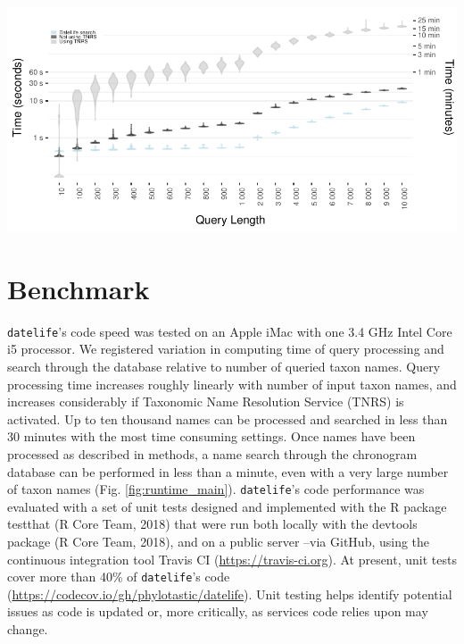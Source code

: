 \documentclass[
  man]{apa6}
\begin{document}
\begin{center}
\includegraphics[width= 6.5in]{../figures/fig_runtime_main.pdf}
\end{center}

\label{fig:runtime_main}

\hypertarget{benchmark}{%
\section{Benchmark}\label{benchmark}}

\texttt{datelife}'s code speed was tested on an Apple iMac
with one 3.4 GHz Intel Core i5 processor.
We registered variation in computing time of query processing and search through the database relative to number of queried taxon names.
Query processing time increases roughly linearly with number of input taxon names, and
increases considerably if Taxonomic Name Resolution Service (TNRS) is activated.
Up to ten thousand names can be processed and searched in less than 30 minutes with the most time consuming settings.
Once names have been processed as described in methods, a name search through the chronogram database can be performed in less than a minute, even with a very large number of taxon names (Fig. \ref{fig:runtime_main}).
\texttt{datelife}'s code performance was evaluated with a set of unit tests designed and
implemented with the R package testthat (R Core Team, 2018) that were run both locally
with the devtools package (R Core Team, 2018), and on a public server --via
GitHub, using the continuous integration tool Travis CI (\url{https://travis-ci.org}). At
present, unit tests cover more than 40\% of \texttt{datelife}'s code (\url{https://codecov.io/gh/phylotastic/datelife}).
Unit testing helps identify potential issues as code is updated or, more critically, as services code relies upon may change.
\end{document}
